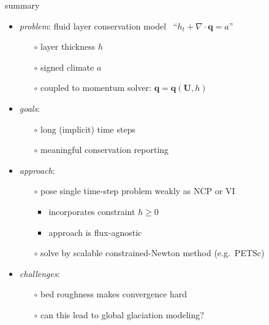 \documentclass[xcolor={dvipsnames}]{beamer}
\newcommand\bq{\mathbf{q}}
\newcommand\bU{\mathbf{U}}
\newcommand\Div{\nabla\cdot}
\begin{document}
\begin{frame}{summary}

  \begin{itemize}
  \item \emph{problem}: fluid layer conservation model \, ``$h_t + \Div\bq = a$''
    \begin{itemize}
    \item[$\circ$]  layer thickness $h$
    \item[$\circ$]  signed climate $a$
    \item[$\circ$]  coupled to momentum solver: $\bq=\bq(\bU,h)$
    \end{itemize}
  \item \emph{goals}:
    \begin{itemize}
    \item[$\circ$]  long (implicit) time steps
    \item[$\circ$]  meaningful conservation reporting
    \end{itemize}
  \item \emph{approach}:
    \begin{itemize}
    \item[$\circ$]  pose single time-step problem weakly as NCP or VI
      \begin{itemize}
      \item  incorporates constraint $h\ge 0$
      \item  approach is flux-agnostic
      \end{itemize}
    \item[$\circ$]  solve by scalable constrained-Newton method (e.g.~PETSc)
    \end{itemize}
  \item \emph{challenges}:
    \begin{itemize}
    \item[$\circ$]  bed roughness makes convergence hard
    \item[$\circ$]  can this lead to global glaciation modeling?
    \end{itemize}
  \end{itemize}
\end{frame}
\end{document}
